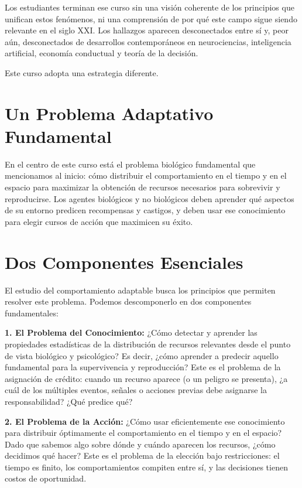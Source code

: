 \documentclass[
  letterpaper,
  DIV=11,
  numbers=noendperiod]{scrreprt}
\begin{document}
Los estudiantes terminan ese curso sin una visión coherente de los
principios que unifican estos fenómenos, ni una comprensión de por qué
este campo sigue siendo relevante en el siglo XXI. Los hallazgos
aparecen desconectados entre sí y, peor aún, desconectados de
desarrollos contemporáneos en neurociencias, inteligencia artificial,
economía conductual y teoría de la decisión.

Este curso adopta una estrategia diferente.

\section{Un Problema Adaptativo
Fundamental}\label{un-problema-adaptativo-fundamental}

En el centro de este curso está el problema biológico fundamental que
mencionamos al inicio: cómo distribuir el comportamiento en el tiempo y
en el espacio para maximizar la obtención de recursos necesarios para
sobrevivir y reproducirse. Los agentes biológicos y no biológicos deben
aprender qué aspectos de su entorno predicen recompensas y castigos, y
deben usar ese conocimiento para elegir cursos de acción que maximicen
su éxito.

\section{Dos Componentes Esenciales}\label{dos-componentes-esenciales}

El estudio del comportamiento adaptable busca los principios que
permiten resolver este problema. Podemos descomponerlo en dos
componentes fundamentales:

\textbf{1. El Problema del Conocimiento:} ¿Cómo detectar y aprender las
propiedades estadísticas de la distribución de recursos relevantes desde
el punto de vista biológico y psicológico? Es decir, ¿cómo aprender a
predecir aquello fundamental para la supervivencia y reproducción? Este
es el problema de la asignación de crédito: cuando un recurso aparece (o
un peligro se presenta), ¿a cuál de los múltiples eventos, señales o
acciones previas debe asignarse la responsabilidad? ¿Qué predice qué?

\textbf{2. El Problema de la Acción:} ¿Cómo usar eficientemente ese
conocimiento para distribuir óptimamente el comportamiento en el tiempo
y en el espacio? Dado que sabemos algo sobre dónde y cuándo aparecen los
recursos, ¿cómo decidimos qué hacer? Este es el problema de la elección
bajo restricciones: el tiempo es finito, los comportamientos compiten
entre sí, y las decisiones tienen costos de oportunidad.
\end{document}

